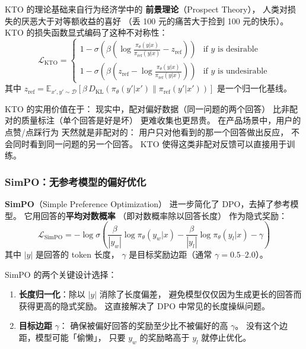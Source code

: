 KTO 的理论基础来自行为经济学中的
\textbf{前景理论}（Prospect Theory），
人类对损失的厌恶大于对等额收益的喜好
（丢 100 元的痛苦大于捡到 100 元的快乐）。
KTO 的损失函数显式编码了这种不对称性：
\begin{equation}
  \mathcal{L}_{\text{KTO}} = \begin{cases}
    1 - \sigma\!\left(\beta \left(
      \log \frac{\pi_\theta(y|x)}{\pi_{\text{ref}}(y|x)} - z_{\text{ref}}
    \right)\right) & \text{if } y \text{ is desirable} \\[6pt]
    1 - \sigma\!\left(\beta \left(
      z_{\text{ref}} - \log \frac{\pi_\theta(y|x)}{\pi_{\text{ref}}(y|x)}
    \right)\right) & \text{if } y \text{ is undesirable}
  \end{cases}
  \label{eq:kto}
\end{equation}
其中 $z_{\text{ref}} = \mathbb{E}_{x',y' \sim \mathcal{D}}
\left[\beta \, D_{\text{KL}}(\pi_\theta(y'|x') \| \pi_{\text{ref}}(y'|x'))\right]$
是一个归一化基线。

KTO 的实用价值在于：
现实中，配对偏好数据（同一问题的两个回答）
比非配对的质量标注（单个回答是好是坏）
更难收集也更昂贵。
在产品场景中，用户的点赞/点踩行为
天然就是非配对的：
用户只对他看到的那一个回答做出反应，
不会同时看到同一问题的另一个回答。
KTO 使得这类非配对反馈可以直接用于训练。

\subsubsection{SimPO：无参考模型的偏好优化}


\textbf{SimPO}（Simple Preference Optimization）
进一步简化了 DPO，去掉了参考模型。
它用回答的\textbf{平均对数概率}
（即对数概率除以回答长度）
作为隐式奖励：
\begin{equation}
  \mathcal{L}_{\text{SimPO}} = -\log \sigma\!\left(
    \frac{\beta}{|y_w|} \log \pi_\theta(y_w|x)
    - \frac{\beta}{|y_l|} \log \pi_\theta(y_l|x) - \gamma
  \right)
  \label{eq:simpo}
\end{equation}
其中 $|y|$ 是回答的 token 长度，
$\gamma$ 是目标奖励边距（通常 $\gamma = 0.5$--$2.0$）。

SimPO 的两个关键设计选择：
\begin{enumerate}[noitemsep]
  \item \textbf{长度归一化}：除以 $|y|$ 消除了长度偏差，
        避免模型仅仅因为生成更长的回答而获得更高的隐式奖励。
        这直接解决了 DPO 中常见的长度操纵问题。
  \item \textbf{目标边距} $\gamma$：
        确保被偏好回答的奖励至少比不被偏好的高 $\gamma$。
        没有这个边距，模型可能「偷懒」，
        只要 $y_w$ 的奖励略高于 $y_l$ 就停止优化。
\end{enumerate}

